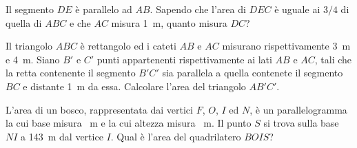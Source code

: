 \begin{multicols}{2}
%

\begin{esercizio}
\label{ese:7.106}
Il segmento $DE$ è parallelo ad $AB$. Sapendo che l'area di $DEC$ è 
uguale ai $3/4$ di quella di $ABC$ e che $AC$ misura 1~m, quanto 
misura $DC$?
\end{esercizio}

%

\begin{esercizio}
\label{ese:7.107}
Il triangolo $ABC$ è rettangolo ed i cateti $AB$ e $AC$ misurano 
rispettivamente 3~m e 4~m. Siano $B'$ e $C'$ punti appartenenti 
rispettivamente ai lati $AB$ e $AC$, tali che la retta contenente il 
segmento $B'C'$ sia parallela a quella contenete il segmento $BC$ e 
distante 1~m da essa. Calcolare l'area del triangolo $AB'C'$.
\end{esercizio}

%

\begin{esercizio}
\label{ese:7.108}
L'area di un bosco, rappresentata dai vertici $F$, $O$, $I$ ed $N$, è 
un parallelogramma la cui base misura ~m e la cui altezza 
misura ~m. Il punto $S$ si trova sulla base $NI$ a 143~m dal 
vertice $I$. Qual è l'area del quadrilatero $BOIS$?
\end{esercizio}

%


\end{multicols}
